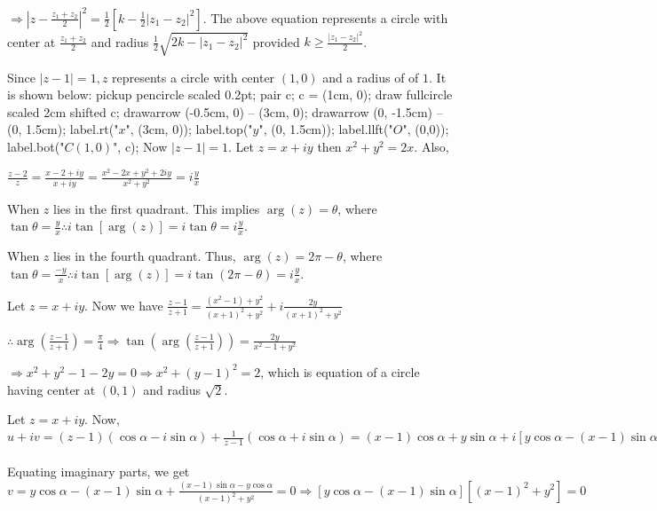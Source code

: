   $\Rightarrow \left|z - \frac{z_1 + z_2}{2}\right|^2 = \frac{1}{2}\left[k - \frac{1}{2}|z_1 -
    z_2|^2\right]$. The above equation represents a circle with center at $\frac{z_1 + z_2}{2}$ and radius
  $\frac{1}{2}\sqrt{2k - |z_1 - z_2|^2}$ provided $k\geq \frac{|z_1 - z_2|^2}{2}$.
\item Since $|z - 1| = 1, z$ represents a circle with center $(1, 0)$ and a radius of of $1$. It is shown
  below:
  \startplacefigure[location={left,none}]
    \startMPcode
      pickup pencircle scaled 0.2pt;
      pair c; c = (1cm, 0);
      draw fullcircle scaled 2cm shifted c;
      drawarrow (-0.5cm, 0) -- (3cm, 0);
      drawarrow (0, -1.5cm) -- (0, 1.5cm);
      label.rt("$x$", (3cm, 0));
      label.top("$y$", (0, 1.5cm));
      label.llft("$O$", (0,0));
      label.bot("$C(1, 0)$", c);
    \stopMPcode
  \stopplacefigure
  Now $|z - 1| = 1$. Let $z = x + iy$ then $x^2 + y^2 = 2x$. Also,

  $\frac{z - 2}{z} = \frac{x - 2 + iy}{x + iy} = \frac{x^2 - 2x + y^2 + 2iy}{x^2 + y^2} = i\frac{y}{x}$

   When $z$ lies in the first quadrant. This implies $\arg(z) = \theta$, where
  $\tan\theta = \frac{y}{x} \therefore i\tan[\arg(z)] = i\tan\theta = i\frac{y}{x}$.

   When $z$ lies in the fourth quadrant. Thus, $\arg(z) = 2\pi - \theta$, where
  $\tan\theta = \frac{-y}{x}\therefore i\tan[\arg(z)] = i\tan(2\pi - \theta) = i\frac{y}{x}$.
\item Let $z = x + iy$. Now we have $\frac{z - 1}{z + 1} = \frac{(x^2 - 1) + y^2}{(x + 1)^2 + y^2} +
  i\frac{2y}{(x + 1)^2 + y^2}$

  $\therefore \arg\left(\frac{z - 1}{z + 1}\right) = \frac{\pi}{4}\Rightarrow \tan\left(\arg\left(\frac{z -
    1}{z + 1}\right)\right) = \frac{2y}{x^2 - 1 + y^2}$

  $\Rightarrow x^2 + y^2 - 1 -2 y = 0 \Rightarrow x^2 + (y - 1)^2 = 2$, which is equation of a circle having
  center at $(0, 1)$ and radius $\sqrt{2}$.
\item Let $z = x + iy$. Now, $u + iv = (z - 1)(\cos\alpha - i\sin\alpha) + \frac{1}{z - 1}(\cos\alpha +
  i\sin\alpha)= (x - 1)\cos\alpha + y\sin\alpha + i[y\cos\alpha - (x - 1)\sin\alpha] + \frac{x - 1 - iy}{(x
    - 1)^2 + y^2}(\cos\alpha + i\sin\alpha) = 0$

  Equating imaginary parts, we get
  $v = y\cos\alpha - (x - 1)\sin\alpha + \frac{(x - 1)\sin\alpha - y\cos\alpha}{(x - 1)^2 + y^2} =
  0\Rightarrow [y\cos\alpha - (x - 1)\sin\alpha][(x - 1)^2 + y^2] = 0$

